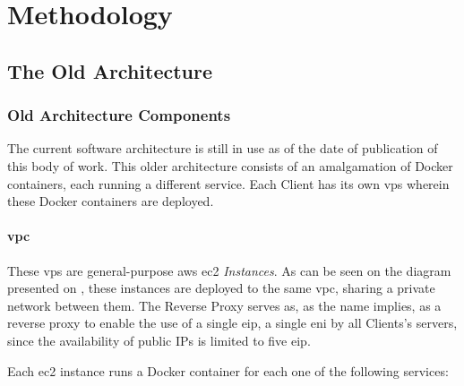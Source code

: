\chapter{Methodology}\label{methodology}

\section{The Old Architecture}\label{methodology:s:the-old-architecture}

\subsection{Old Architecture Components }\label{methodology:ss:current-architecture}

The current software architecture is still in use as of the date of publication of this body of work. This older architecture consists of an amalgamation of Docker containers, each running a different service. Each Client has its own \gls{vps} wherein these Docker containers are deployed. 


\subsubsection{\gls{vpc}}\label{methodology:sss:vpc}

These \gls{vps} are general-purpose \gls{aws} \gls{ec2} \textit{Instances}. As can be seen on the diagram presented on , these instances are deployed to the same \gls{vpc}, sharing a private network between them. The Reverse Proxy serves as, as the name implies, as a reverse proxy to enable the use of a single \gls{eip}, a single \gls{eni} by all Clients's servers, since the availability of public IPs is limited to five \gls{eip}.




Each \gls{ec2} instance runs a Docker container for each one of the following services:

